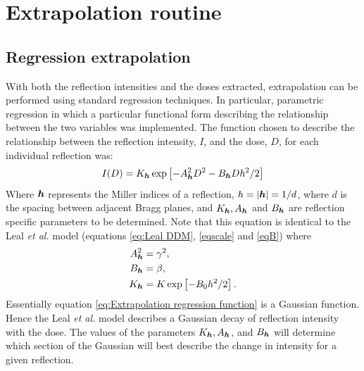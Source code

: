 \section{Extrapolation routine}
\label{sec:Extrapolation routine}

\subsection{Regression extrapolation}
\label{sub:Regression extrapolation}
With both the reflection intensities and the doses extracted, extrapolation can be performed using standard regression techniques.
In particular, parametric regression in which a particular functional form describing the relationship between the two variables was implemented.
The function chosen to describe the relationship between the reflection intensity, $I$, and the dose, $D$, for each individual reflection was:
\begin{equation}
    I(D) = K_{\boldsymbol{h}} \exp \left[- A^2_{\boldsymbol{h}}D^2 - B_{\boldsymbol{h}}D h^2/2 \right]
    \label{eq:Extrapolation regression function}
\end{equation}
Where $\boldsymbol{h}$ represents the Miller indices of a reflection, $h = |\boldsymbol{h}| = 1/d$, where $d$ is the spacing between adjacent Bragg planes, and $K_{\boldsymbol{h}}, A_{\boldsymbol{h}}$ and $B_{\boldsymbol{h}}$ are reflection specific parameters to be determined.
Note that this equation is identical to the Leal \textit{et al.} model (equations \ref{eq:Leal DDM}, \ref{eqscale} and \ref{eqB}) where
\begin{align}
    A^2_{\boldsymbol{h}} &= \gamma^2, \\
    B_{\boldsymbol{h}} &= \beta, \\
    K_{\boldsymbol{h}} &= K\exp \left[ -B_0 h^2/2 \right].
\end{align}
Essentially equation \ref{eq:Extrapolation regression function} is a Gaussian function.
Hence the Leal \textit{et al.} model describes a Gaussian decay of reflection intensity with the dose.
The values of the parameters $K_{\boldsymbol{h}}, A_{\boldsymbol{h}}$, and $B_{\boldsymbol{h}}$ will determine which section of the Gaussian will best describe the change in intensity for a given reflection.

